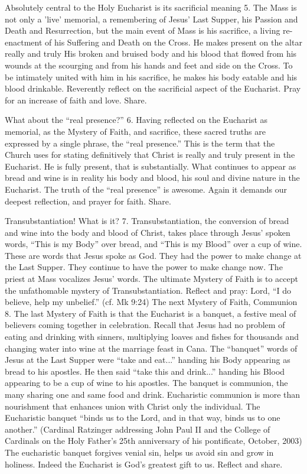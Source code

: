 \documentclass[oneside]{book}
\begin{document}
Absolutely central to the Holy Eucharist is its sacrificial meaning
5. The Mass is not only a 'live' memorial, a remembering of Jesus' Last Supper,
his Passion and Death and Resurrection, but the main event of Mass is his
sacrifice, a living re-enactment of his Suffering and Death on the Cross. He
makes present on the altar really and truly His broken and bruised body and his
blood that flowed from his wounds at the scourging and from his hands and feet
and side on the Cross. To be intimately united with him in his sacrifice, he
makes his body eatable and his blood drinkable. Reverently reflect on the
sacrificial aspect of the Eucharist. Pray for an increase of faith and
love. Share.

What about the ``real presence?''
6. Having reflected on the Eucharist as memorial, as the Mystery of Faith, and
sacrifice, these sacred truths are expressed by a single phrase, the ``real
presence.'' This is the term that the Church uses for stating definitively that
Christ is really and truly present in the Eucharist. He is fully present, that
is substantially. What continues to appear as bread and wine is in reality his
body and blood, his soul and divine nature in the Eucharist. The truth of the
``real presence'' is awesome. Again it demands our deepest reflection, and
prayer for faith. Share.

Transubstantiation! What is it?
7. Transubstantiation, the conversion of bread and wine into the body and blood
of Christ, takes place through Jesus' spoken words, ``This is my Body'' over
bread, and ``This is my Blood'' over a cup of wine. These are words that Jesus
spoke as God. They had the power to make change at the Last Supper. They
continue to have the power to make change now. The priest at Mass vocalizes
Jesus' words. The ultimate Mystery of Faith is to accept the unfathomable
mystery of Transubstantiation. Reflect and pray: Lord, ``I do believe, help my
unbelief.'' (cf. Mk 9:24)
The next Mystery of Faith, Communion
8. The last Mystery of Faith is that the Eucharist is a banquet, a festive meal
of believers coming together in celebration. Recall that Jesus had no problem of
eating and drinking with sinners, multiplying loaves and fishes for thousands
and changing water into wine at the marriage feast in Cana. The ``banquet''
words of Jesus at the Last Supper were ``take and eat...'' handing his Body
appearing as bread to his apostles. He then said ``take this and drink...''
handing his Blood appearing to be a cup of wine to his apostles. The banquet is
communion, the many sharing one and same food and drink. Eucharistic communion
is more than nourishment that enhances union with Christ only the
individual. The Eucharistic banquet ``binds us to the Lord, and in that way,
binds us to one another.'' (Cardinal Ratzinger addressing John Paul II and the
College of Cardinals on the Holy Father's 25th anniversary of his pontificate,
October, 2003) The eucharistic banquet forgives venial sin, helps us avoid sin
and grow in holiness. Indeed the Eucharist is God's greatest gift to us. Reflect
and share.
\end{document}
